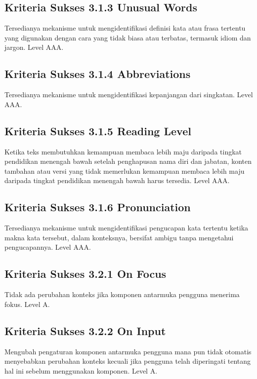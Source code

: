 \subsection{Kriteria Sukses 3.1.3 Unusual Words}
\label{sec:kriteria_3.1.3}
Tersedianya mekanisme untuk mengidentifikasi definisi kata atau frasa tertentu yang digunakan dengan cara yang tidak biasa atau terbatas, termasuk idiom dan jargon.
Level AAA.

\subsection{Kriteria Sukses 3.1.4 Abbreviations}
\label{sec:kriteria_3.1.4}
Tersedianya mekanisme untuk mengidentifikasi kepanjangan dari singkatan.
Level AAA.

\subsection{Kriteria Sukses 3.1.5 Reading Level}
\label{sec:kriteria_3.1.5}
Ketika teks membutuhkan kemampuan membaca lebih maju daripada tingkat pendidikan menengah bawah setelah penghapusan nama diri dan jabatan, konten tambahan atau versi yang tidak memerlukan kemampuan membaca lebih maju daripada tingkat pendidikan menengah bawah harus tersedia.
Level AAA.

\subsection{Kriteria Sukses 3.1.6 Pronunciation}
\label{sec:kriteria_3.1.6}
Tersedianya mekanisme untuk mengidentifikasi pengucapan kata tertentu ketika makna kata tersebut, dalam konteksnya, bersifat ambigu tanpa mengetahui pengucapannya.
Level AAA.

\subsection{Kriteria Sukses 3.2.1 On Focus}
\label{sec:kriteria_3.2.1}
Tidak ada perubahan konteks jika komponen antarmuka pengguna menerima fokus.
Level A.

\subsection{Kriteria Sukses 3.2.2 On Input}
\label{sec:kriteria_3.2.2}
Mengubah pengaturan komponen antarmuka pengguna mana pun tidak otomatis menyebabkan perubahan konteks kecuali jika pengguna telah diperingati tentang hal ini sebelum menggunakan komponen.
Level A.

